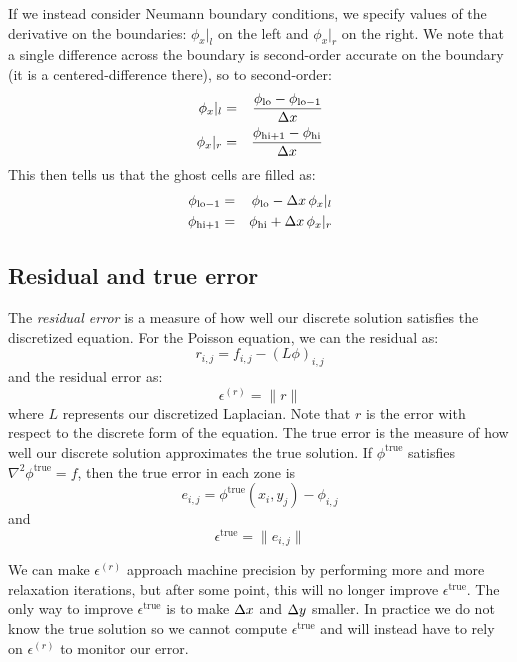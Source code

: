 If we instead consider Neumann boundary conditions, we specify values
of the derivative on the boundaries: $\phi_x |_l$ on the left and
$\phi_x |_r$ on the right.  We note that a single difference across
the boundary is second-order accurate on the boundary (it is a
centered-difference there), so to second-order:
\begin{eqnarray}
\phi_x |_l &=& \frac{\phi_\mathrm{lo} - \phi_\mathrm{lo-1}}{\Delta x} \\
\phi_x |_r &=& \frac{\phi_\mathrm{hi+1} - \phi_\mathrm{hi}}{\Delta x}
\end{eqnarray}
This then tells us that the ghost cells are filled as:
\begin{eqnarray}
\label{eq:bc_inhomo_neum}
\phi_\mathrm{lo-1} &=& \phi_\mathrm{lo} - \Delta x \, \phi_x |_l \\
\phi_\mathrm{hi+1} &=& \phi_\mathrm{hi} + \Delta x \, \phi_x |_r
\end{eqnarray}


\subsection{Residual and true error}

The {\em residual error} is a measure of how well our discrete solution
satisfies the discretized equation.  For the Poisson equation, we
can the residual as:
\begin{equation}
r_{i,j} = f_{i,j} - (L \phi)_{i,j} 
\end{equation}
and the residual error as:
\begin{equation}
\epsilon^{(r)} = \| r \|
\end{equation}
where $L$ represents our discretized Laplacian.  Note that $r$ is the
error with respect to the discrete form of the equation.  The true
error is the measure of how well our discrete solution approximates
the true solution.  If $\phi^\mathrm{true}$ satisfies $\nabla^2
\phi^\mathrm{true} = f$, then the true error in each zone is
\begin{equation}
e_{i,j} = \phi^\mathrm{true}(x_i,y_j) - \phi_{i,j} 
\end{equation}
and
\begin{equation}
\epsilon^\mathrm{true} = \| e_{i,j} \|
\end{equation}

We can make $\epsilon^{(r)}$ approach machine precision by performing
more and more relaxation iterations, but after some point, this will
no longer improve $\epsilon^\mathrm{true}$.  The only way to improve
$\epsilon^\mathrm{true}$ is to make $\Delta x$ and $\Delta y$ smaller.
In practice we do not know the true solution so we cannot compute
$\epsilon^\mathrm{true}$ and will instead have to rely on
$\epsilon^{(r)}$ to monitor our error.

